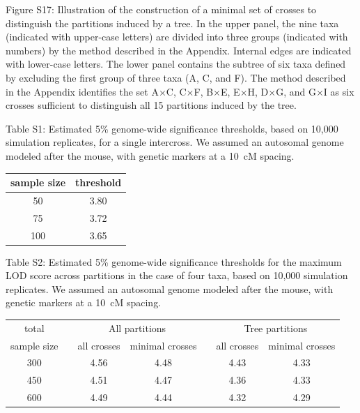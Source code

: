 \documentclass[letterpaper,twoside]{article}
\begin{document}
\bigskip \noindent
Figure S17: Illustration of the construction of a minimal set of
crosses to distinguish the partitions induced by a tree.  In the upper
panel, the nine taxa (indicated with upper-case letters) are divided
into three groups (indicated with numbers) by the method
described in the Appendix.  Internal edges are indicated with
lower-case letters.  The lower panel contains the subtree of
six taxa defined by excluding the first group of three taxa (A, C, and F).
The method described in the Appendix identifies the set A$\times$C,
C$\times$F, B$\times$E, E$\times$H, D$\times$G, and G$\times$I as six
crosses sufficient to distinguish all 15 partitions induced by the tree.


\newpage

\noindent Table S1: Estimated 5\% genome-wide significance thresholds,
based on 10,000 simulation replicates, for a single intercross.  We
assumed an autosomal genome modeled after the mouse, with genetic
markers at a 10~cM spacing.

\bigskip
\bigskip

\renewcommand{\arraystretch}{1.8}
\begin{center}
\begin{tabular}{cc}
\hline
sample size    &   threshold \\ \hline
50    &  3.80 \\ 
75    &  3.72 \\
100   &  3.65 \\ \hline
\end{tabular}
\end{center}


\newpage

\noindent Table S2: Estimated 5\% genome-wide significance thresholds
for the maximum LOD score across partitions in the case of four taxa,
based on 10,000 simulation replicates.  We
assumed an autosomal genome modeled after the mouse, with genetic
markers at a 10~cM spacing.

\bigskip
\bigskip

\renewcommand{\arraystretch}{1.8}
\begin{center}
\begin{tabular}{cc cc c cc}
\hline
total             &\hspace*{5mm}& \multicolumn{2}{c}{All partitions} &\hspace*{5mm}& \multicolumn{2}{c}{Tree partitions} \\
 \cline{3-4} \cline{6-7}
sample size      && all crosses & minimal crosses  && all crosses &  minimal crosses \\ \hline
300              &&     4.56  &      4.48  &&     4.43   &      4.33 \\ 
450              &&     4.51  &      4.47  &&     4.36   &      4.33 \\
600              &&     4.49  &      4.44  &&     4.32   &      4.29 \\ \hline
\end{tabular}
\end{center}
\end{document}
